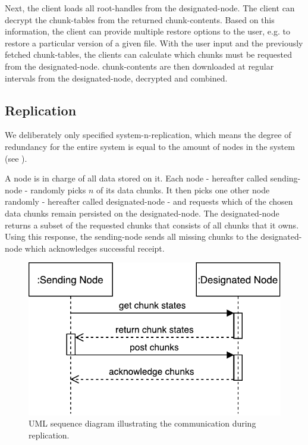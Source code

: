 Next, the \gls{client} loads all \glspl{root-handle} from the \gls{designated-node}. The \gls{client} can decrypt the \glspl{chunk-table} from the returned \glspl{chunk-content}. Based on this information, the \gls{client} can provide multiple restore options to the \gls{user}, e.g. to restore a particular version of a given file.
With the user input and the previously fetched \glspl{chunk-table}, the \glspl{client} can calculate which \glspl{chunk} must be requested from the \gls{designated-node}. \Glspl{chunk-content} are then downloaded at regular intervals from the \gls{designated-node}, decrypted and combined.

\subsection{Replication}\label{sec:replication}
We deliberately only specified \gls{system-n-replication}, which means the degree of redundancy for the entire system is equal to the amount of \glspl{node} in the system (see ).

A \gls{node} is in charge of all data stored on it. Each \gls{node} - hereafter called \gls{sending-node} - randomly picks $n$ of its data \glspl{chunk}. It then picks one other \gls{node} randomly - hereafter called \gls{designated-node} - and requests which of the chosen data \glspl{chunk} remain persisted on the \gls{designated-node}. The \gls{designated-node} returns a subset of the requested \glspl{chunk} that consists of all \glspl{chunk} that it owns. Using this response, the \gls{sending-node} sends all missing \glspl{chunk} to the \gls{designated-node} which acknowledges successful receipt.

\begin{figure}[h]
    \centering
    \includegraphics[width=0.6\linewidth]{resources/data_replication_designation}
    \caption[Data Replication UML Sequence Diagram]{UML sequence diagram illustrating the communication during replication.}
\end{figure}

